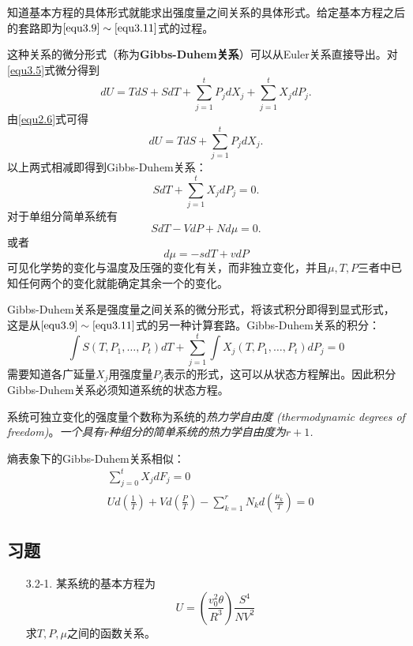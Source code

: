 知道基本方程的具体形式就能求出强度量之间关系的具体形式。给定基本方程之后的套路即为$\eqref{equ3.9} \sim \eqref{equ3.11}$式的过程。

这种关系的微分形式（称为{\bf Gibbs-Duhem关系}）可以从Euler关系直接导出。对\eqref{equ3.5}式微分得到
\begin{equation}
\label{equ3.12}
	dU = TdS + SdT + \sum_{j = 1}^t P_j dX_j + \sum_{j = 1}^t X_j dP_j.
\end{equation}
由\eqref{equ2.6}式可得
\begin{equation}
\label{equ3.13}
	dU = TdS + \sum_{j = 1}^t P_j dX_j.
\end{equation}
以上两式相减即得到Gibbs-Duhem关系：
\begin{equation}
\label{equ3.14}
	SdT + \sum_{j = 1}^t X_j dP_j = 0.
\end{equation}
对于单组分简单系统有
\begin{equation}
\label{equ3.15}
	SdT - VdP + Nd\mu = 0.
\end{equation}
或者
\begin{equation}
\label{equ3.16}
	d\mu = -sdT + vdP
\end{equation}
可见化学势的变化与温度及压强的变化有关，而非独立变化，并且$\mu, T, P$三者中已知任何两个的变化就能确定其余一个的变化。

Gibbs-Duhem关系是强度量之间关系的微分形式，将该式积分即得到显式形式，这是从$\eqref{equ3.9} \sim \eqref{equ3.11}$式的另一种计算套路。Gibbs-Duhem关系的积分：
\[
	\int S(T, P_1, \dots, P_t) dT + \sum_{j = 1}^t \int X_j(T, P_1, \dots, P_t) dP_j = 0
\]
需要知道各广延量$X_j$用强度量$P_j$表示的形式，这可以从状态方程解出。因此积分Gibbs-Duhem关系必须知道系统的状态方程。

系统可独立变化的强度量个数称为系统的{\it 热力学自由度 (thermodynamic degrees of freedom)}。{\it 一个具有$r$种组分的简单系统的热力学自由度为$r + 1$.}

熵表象下的Gibbs-Duhem关系相似：
\begin{align}
	&\sum_{j = 0}^t X_j dF_j = 0 \label{equ3.17} \\
	&U d\left( \frac{1}{T} \right) + V d\left( \frac{P}{T} \right) - \sum_{k = 1}^r N_k d\left( \frac{\mu_k}{T}\right) = 0 \label{equ3.18}
\end{align}


\subsection*{习题}
\begin{itemize}
\item[3.2-1.] 某系统的基本方程为
\[
	U = \left( \frac{v_0^2 \theta}{R^3} \right) \frac{S^4}{NV^2}
\]
求$T, P, \mu$之间的函数关系。
\end{itemize}


